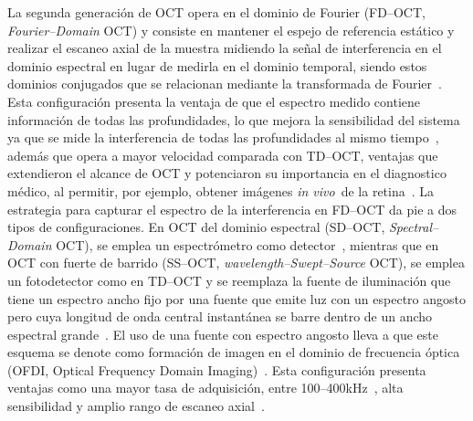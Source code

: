 \documentclass[letter, 12 pt]{article}
\newcommand{\invi}{\textit{in vivo}\ }
\begin{document}
La segunda generación de OCT opera en el dominio de Fourier (FD--OCT, \textit{Fourier--Domain} OCT) y consiste en mantener el espejo de referencia estático y realizar el escaneo axial de la muestra midiendo la señal de interferencia en el dominio espectral en lugar de medirla en el dominio temporal, siendo estos dominios conjugados que se relacionan mediante la transformada de Fourier~\cite{Fercher1995_Measurement}. Esta configuración presenta la ventaja de que el espectro medido contiene información de todas las profundidades, lo que mejora la sensibilidad del sistema ya que se mide la interferencia de todas las profundidades al mismo tiempo~\cite{Leitgeb2003_Performance}, además que opera a mayor velocidad comparada con TD--OCT, ventajas que extendieron el alcance de OCT y potenciaron su importancia en el diagnostico médico, al permitir, por ejemplo, obtener imágenes \invi de la retina~\cite{Nassif2004_Vivo}. La estrategia para capturar el espectro de la interferencia en FD--OCT da pie a dos tipos de configuraciones. En OCT del dominio espectral (SD--OCT, \textit{Spectral--Domain} OCT), se emplea un espectrómetro como detector~\cite{Fercher1995_Measurement}, mientras que en OCT con fuerte de barrido (SS--OCT, \textit{wavelength--Swept--Source} OCT), se emplea un fotodetector como en TD--OCT y se reemplaza la fuente de iluminación que tiene un espectro ancho fijo por una fuente que emite luz con un espectro angosto pero cuya longitud de onda central instantánea se barre dentro de un ancho espectral grande~\cite{Chinn1997_Optical}. El uso de una fuente con espectro angosto lleva a que este esquema se denote como formación de imagen en el dominio de frecuencia óptica (OFDI, Optical Frequency Domain Imaging)~\cite{Yun2003_High}. Esta configuración presenta ventajas como una mayor tasa de adquisición, entre 100--400kHz~\cite{Oh2010_400}, alta sensibilidad y amplio rango de escaneo axial~\cite{Choma2003_Sensitivity}. \\
\end{document}
